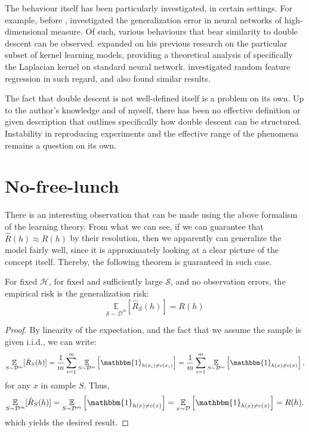 \documentclass[10pt]{article} %
\begin{document}
The behaviour itself has been particularly investigated, in certain settings. For example, before \cite{belkin_reconciling_2019}, \cite{advani2017highdimensionaldynamicsgeneralizationerror} investigated the generalization error in neural networks of high-dimensional measure. Of such, various behaviours that bear similarity to double descent can be observed. \cite{belkin2018understanddeeplearningneed} expanded on his previous research on the particular subset of kernel learning models, providing a theoretical analysis of specifically the Laplacian kernel on standard neural network. \cite{mei2020generalizationerrorrandomfeatures} investigated random feature regression in such regard, and also found similar results. 

The fact that double descent is not well-defined itself is a problem on its own. Up to the author's knowledge and of myself, there has been no effective definition or given description that outlines specifically how double descent can be structured. Instability in reproducing experiments and the effective range of the phenomena remains a question on its own. 

\section{No-free-lunch}

There is an interesting observation that can be made using the above formalism of the learning theory. From what we can see, if we can guarantee that $\hat{R}(h)\approx R(h)$ by their resolution, then we apparently can generalize the model fairly well, since it is approximately looking at a clear picture of the concept itself. Thereby, the following theorem is guaranteed in such case. 

\begin{theorem}[\cite{10.5555/2371238}]\label{thm:minimalNeu}
    For fixed $\mathcal{H}$, for fixed and sufficiently large $\mathcal{S}$, and no observation errors, the empirical risk is the generalization risk: \begin{equation}
        \underset{\mathcal{S}\sim \mathcal{D}^{m}}{\mathbb{E}}[\hat{R}_{\mathcal{S}}(h)]  = R(h)
    \end{equation} 
\end{theorem}
\begin{proof}
    By linearity of the expectation, and the fact that we assume the sample is given i.i.d., we can write: 
\[
\underset{S \sim \mathcal{D}^m}{\mathbb{E}}[\hat{R}_S(h)] 
= \frac{1}{m} \sum_{i=1}^m 
\underset{S \sim \mathcal{D}^m}{\mathbb{E}} 
\left[ \mathbbm{1}_{h(x_i) \ne c(x_i)} \right] 
= \frac{1}{m} \sum_{i=1}^m 
\underset{S \sim \mathcal{D}^m}{\mathbb{E}} 
\left[ \mathbbm{1}_{h(x) \ne c(x)} \right],
\]
for any \( x \) in sample \( S \). Thus,
\[
\underset{S \sim \mathcal{D}^m}{\mathbb{E}}[\hat{R}_S(h)] 
= \underset{S \sim \mathcal{D}^m}{\mathbb{E}} 
\left[ \mathbbm{1}_{h(x) \ne c(x)} \right] 
= \underset{x \sim \mathcal{D}}{\mathbb{E}} 
\left[ \mathbbm{1}_{h(x) \ne c(x)} \right] 
= R(h).
\]
which yields the desired result. 
\end{proof}
\end{document}
